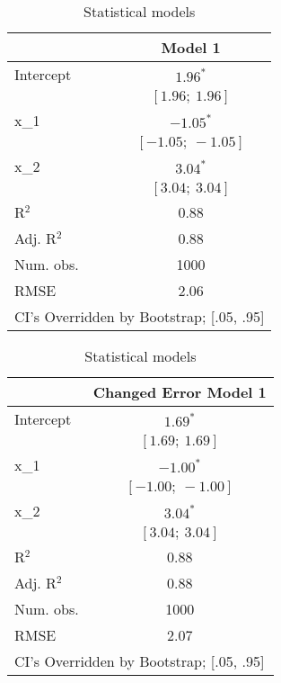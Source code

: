 \documentclass[12pt]{article}\usepackage[]{graphicx}\usepackage[]{color}
\begin{document}
\begin{flushleft}
\begin{table}[h!]
\caption{Statistical models}
\begin{center}
\begin{tabular}{l c }
\hline
 & Model 1 \\
\hline
Intercept  & $1.96^{*}$        \\
           & $[1.96;\ 1.96]$   \\
x\_1       & $-1.05^{*}$       \\
           & $[-1.05;\ -1.05]$ \\
x\_2       & $3.04^{*}$        \\
           & $[3.04;\ 3.04]$   \\
\hline
R$^2$      & 0.88              \\
Adj. R$^2$ & 0.88              \\
Num. obs.  & 1000              \\
RMSE       & 2.06              \\
\hline
\multicolumn{2}{l}{\scriptsize{CI's Overridden by Bootstrap; [.05, .95]}}
\end{tabular}
\label{table:coefficients}
\end{center}
\end{table}


\begin{table}[h!]
\caption{Statistical models}
\begin{center}
\begin{tabular}{l c }
\hline
 & Changed Error Model 1 \\
\hline
Intercept  & $1.69^{*}$        \\
           & $[1.69;\ 1.69]$   \\
x\_1       & $-1.00^{*}$       \\
           & $[-1.00;\ -1.00]$ \\
x\_2       & $3.04^{*}$        \\
           & $[3.04;\ 3.04]$   \\
\hline
R$^2$      & 0.88              \\
Adj. R$^2$ & 0.88              \\
Num. obs.  & 1000              \\
RMSE       & 2.07              \\
\hline
\multicolumn{2}{l}{\scriptsize{CI's Overridden by Bootstrap; [.05, .95]}}
\end{tabular}
\label{table:coefficients}
\end{center}
\end{table}



\end{flushleft}
\end{document}
